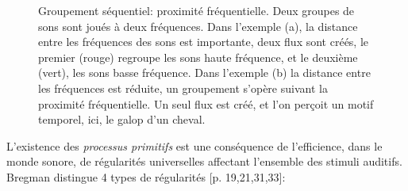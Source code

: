 {\begin{figure}[t]
        \myfloatalign
        \caption[Groupement séquentiel : proximité fréquentielle.]{Groupement séquentiel: proximité fréquentielle. Deux groupes de sons sont joués à deux fréquences. Dans l'exemple (a), la distance entre les fréquences des sons est importante, deux flux sont créés, le premier (rouge) regroupe les sons haute fréquence, et le deuxième (vert), les sons basse fréquence. Dans l'exemple (b) la distance entre les fréquences est réduite, un groupement s'opère suivant la proximité fréquentielle. Un seul flux est créé, et l'on perçoit un motif temporel, ici, le galop d'un cheval.}\label{fig:galop}
\end{figure}

L'existence des \emph{processus primitifs} est une conséquence de l'efficience, dans le monde sonore, de régularités universelles affectant l'ensemble des stimuli auditifs. Bregman distingue 4 types de régularités [p. 19,21,31,33]\citep{mcadams1994penser}:

}
